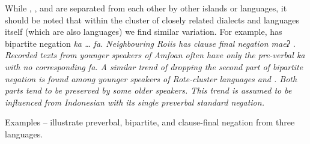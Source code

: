 \newpage
\begin{exe}
	\vspace{-1mm}
\end{exe}

While , , and  are separated from each other by
other islands or languages,
it should be noted that within the  cluster of closely
related dialects and languages itself (which are also  languages)
we find similar variation.
For example,   has bipartite negation \it{ka {\ldots} fa}.
Neighbouring Roi{\Q}is  has clause final negation \it{maeʔ} \citep[412]{Edwards2020}.
Recorded texts from younger speakers of Amfo{\Q}an often have only
the pre-verbal \it{ka} with no corresponding \it{fa}.
A similar trend of dropping the second part of bipartite negation
is found among younger speakers of Rote-cluster languages  and .
Both parts tend to be preserved by some older speakers.
This trend is assumed to be influenced from Indonesian with its
single preverbal standard negation.

Examples -- illustrate preverbal,
bipartite, and clause-final negation from three  languages.

\begin{exe}
	\vspace{-1mm}
	\vspace{-1mm}
	\vspace{-1mm}
\end{exe}

